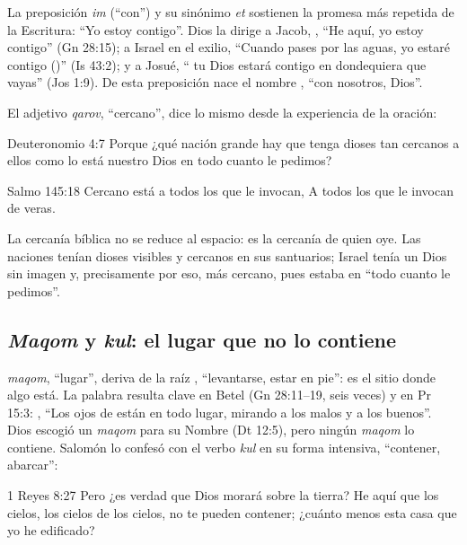 La preposición  \emph{im} (``con'') y su sinónimo  \emph{et} sostienen la promesa más repetida de la Escritura: ``Yo estoy contigo''. Dios la dirige a Jacob, , ``He aquí, yo estoy contigo'' (Gn 28:15); a Israel en el exilio, ``Cuando pases por las aguas, yo estaré contigo ()'' (Is 43:2); y a Josué, ``\SENOR{} tu Dios estará contigo en dondequiera que vayas'' (Jos 1:9). De esta preposición nace el nombre , ``con nosotros, Dios''.

El adjetivo  \emph{qarov}, ``cercano'', dice lo mismo desde la experiencia de la oración:

\begin{verso}{Deuteronomio 4:7}
Porque ¿qué nación grande hay que tenga dioses tan cercanos a ellos como lo está \SENOR{} nuestro Dios en todo cuanto le pedimos?
\end{verso}
\begin{verso}{Salmo 145:18}
Cercano está \SENOR{} a todos los que le invocan, A todos los que le invocan de veras.
\end{verso}

La cercanía bíblica no se reduce al espacio: es la cercanía de quien oye. Las naciones tenían dioses visibles y cercanos en sus santuarios; Israel tenía un Dios sin imagen y, precisamente por eso, más cercano, pues estaba en ``todo cuanto le pedimos''.

\subsection{\emph{Maqom} y \emph{kul}: el lugar que no lo contiene}

 \emph{maqom}, ``lugar'', deriva de la raíz , ``levantarse, estar en pie'': es el sitio donde algo está. La palabra resulta clave en Betel (Gn 28:11--19, seis veces) y en Pr 15:3: , ``Los ojos de \SENOR{} están en todo lugar, mirando a los malos y a los buenos''. Dios escogió un \emph{maqom} para su Nombre (Dt 12:5), pero ningún \emph{maqom} lo contiene. Salomón lo confesó con el verbo  \emph{kul} en su forma intensiva, ``contener, abarcar'':

\begin{verso}{1 Reyes 8:27}
Pero ¿es verdad que Dios morará sobre la tierra? He aquí que los cielos, los cielos de los cielos, no te pueden contener; ¿cuánto menos esta casa que yo he edificado?
\end{verso}

